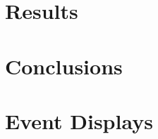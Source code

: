 \documentclass[letterpaper,12pt]{article}
\begin{document}
\section{Results}

\section{Conclusions}

\newpage

\appendix
\section{Event Displays}

\lstset{%
    basicstyle=\scriptsize\ttfamily,
    breaklines=true
}
\end{document}
